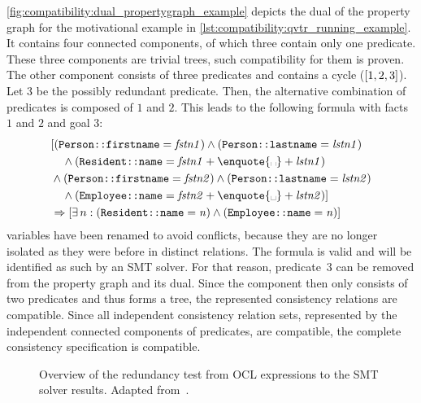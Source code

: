 \begin{example}
\autoref{fig:compatibility:dual_propertygraph_example} depicts the dual of the property graph for the motivational example in \autoref{lst:compatibility:qvtr_running_example}. 
It contains four connected components, of which three contain only one predicate. 
These three components are trivial trees, such compatibility for them is proven.
The other component consists of three predicates and contains a cycle ($[1, 2, 3]$).
Let $3$ be the possibly redundant predicate.
Then, the alternative combination of predicates is composed of $1$ and $2$. 
This leads to the following formula with facts $1$ and $2$ and goal $3$:
\begin{align*}
    &
        [(\propdisplay{Person::firstname} = \mathvariable{fstn1}) \land (\propdisplay{Person::lastname} = \mathvariable{lstn1})\\
    &
        \formulaskip \land (\propdisplay{Resident::name} = \mathvariable{fstn1} + \text{\enquote{\textvisiblespace}} + \mathvariable{lstn1}) \\%
    & 
        \land %
            (\propdisplay{Person::firstname} = \mathvariable{fstn2}) \land (\propdisplay{Person::lastname} = \mathvariable{lstn2})\\
    &
        \formulaskip \land (\propdisplay{Employee::name} = \mathvariable{fstn2} + \text{\enquote{\textvisiblespace}} + \mathvariable{lstn2})]\\
    & 
        \Rightarrow
        [\exists n : (\propdisplay{Resident::name} = \mathvariable{n}) \land (\propdisplay{Employee::name} = \mathvariable{n})]
\end{align*}
\qvtr variables have been renamed to avoid conflicts, because they are no longer isolated as they were before in distinct \qvtr relations.
The formula is valid and will be identified as such by an \gls{SMT} solver.
For that reason, predicate~$3$ can be removed from the property graph and its dual. 
Since the component then only consists of two predicates and thus forms a tree, the represented consistency relations are compatible.
Since all independent consistency relation sets, represented by the independent connected components of predicates, are compatible, the complete consistency specification is compatible.
\end{example}

\begin{figure}
    \centering
    
    \caption[Redundancy test overview]{Overview of the redundancy test from \gls{OCL} expressions to the \gls{SMT} solver results. Adapted from~.}
    \label{fig:compatibility:redundancytest}
\end{figure}

